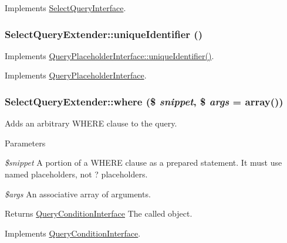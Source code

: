 Implements \hyperlink{interfaceSelectQueryInterface_a563903061a31b87f34189a56d6f8a591}{SelectQueryInterface}.\hypertarget{classSelectQueryExtender_a4bb30825327565c94e01b4f5a785a5ed}{
\subsubsection[{uniqueIdentifier}]{\setlength{\rightskip}{0pt plus 5cm}SelectQueryExtender::uniqueIdentifier ()}}
\label{classSelectQueryExtender_a4bb30825327565c94e01b4f5a785a5ed}
Implements \hyperlink{interfaceQueryPlaceholderInterface_a5f4eb118f1894f0b5785d78d4dbe9847}{QueryPlaceholderInterface::uniqueIdentifier()}. 

Implements \hyperlink{interfaceQueryPlaceholderInterface_a5f4eb118f1894f0b5785d78d4dbe9847}{QueryPlaceholderInterface}.\hypertarget{classSelectQueryExtender_a7ac93a5b39a4b816e95b9c2d588ba45a}{
\subsubsection[{where}]{\setlength{\rightskip}{0pt plus 5cm}SelectQueryExtender::where (\$ {\em snippet}, \/  \$ {\em args} = {\ttfamily array()})}}
\label{classSelectQueryExtender_a7ac93a5b39a4b816e95b9c2d588ba45a}
Adds an arbitrary WHERE clause to the query.


\begin{DoxyParams}{Parameters}
\item[{\em \$snippet}]A portion of a WHERE clause as a prepared statement. It must use named placeholders, not ? placeholders. \item[{\em \$args}]An associative array of arguments.\end{DoxyParams}
\begin{DoxyReturn}{Returns}
\hyperlink{interfaceQueryConditionInterface}{QueryConditionInterface} The called object. 
\end{DoxyReturn}


Implements \hyperlink{interfaceQueryConditionInterface_a42c03c74dd81ef6d77041e67ec12e735}{QueryConditionInterface}.

